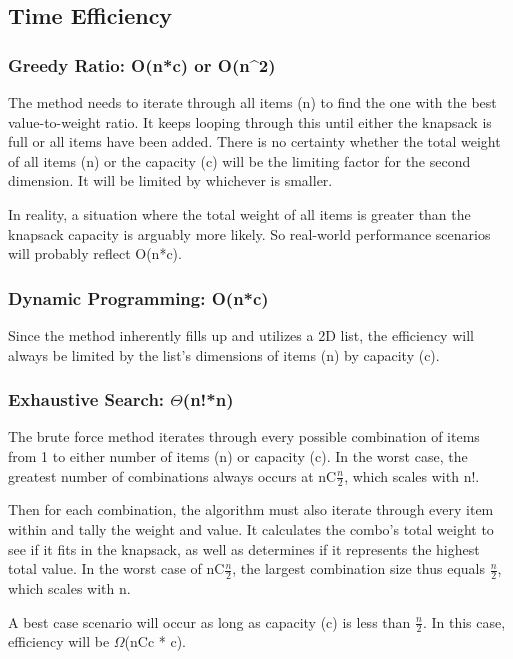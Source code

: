 \documentclass{article}
\begin{document}
\subsection{Time Efficiency}
\subsubsection[Greedy Ratio]{Greedy Ratio: O(n*c) or O(n^2)}
\hspace{\parindent}The method needs to iterate through all items (n) to find the one with the best value-to-weight ratio. It keeps looping through this until either the knapsack is full or all items have been added. There is no certainty whether the total weight of all items (n) or the capacity (c) will be the limiting factor for the second dimension. It will be limited by whichever is smaller.

In reality, a situation where the total weight of all items is greater than the knapsack capacity is arguably more likely. So real-world performance scenarios will probably reflect O(n*c).
\subsubsection[Dynamic Programming]{Dynamic Programming: O(n*c)}
\hspace{\parindent}Since the method inherently fills up and utilizes a 2D list, the efficiency will always be limited by the list's dimensions of items (n) by capacity (c).
\subsubsection[Exhaustive Search]{Exhaustive Search: {\boldmath$\Theta$}(n!*n)}
\hspace{\parindent}The brute force method iterates through every possible combination of items from 1 to either number of items (n) or capacity (c). In the worst case, the greatest number of combinations always occurs at nC$\frac{n}{2}$, which scales with n!.

Then for each combination, the algorithm must also iterate through every item within and tally the weight and value. It calculates the combo's total weight to see if it fits in the knapsack, as well as determines if it represents the highest total value. In the worst case of nC$\frac{n}{2}$, the largest combination size thus equals $\frac{n}{2}$, which scales with n.

A best case scenario will occur as long as capacity (c) is less than $\frac{n}{2}$. In this case, efficiency will be $\Omega$(nCc * c).
\end{document}
